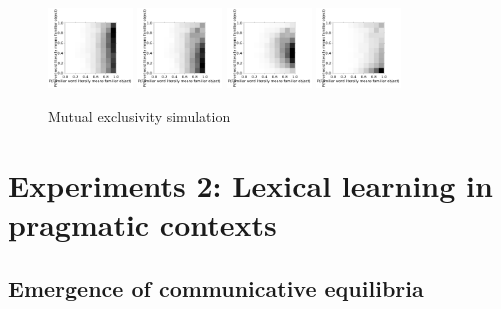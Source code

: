 \documentclass{article} %
\begin{document}
\begin{figure}[t]
  \centering
  \includegraphics[width=0.20\textwidth]{figures/ME-1dax.pdf}
  \includegraphics[width=0.20\textwidth]{figures/ME-flat-10dog-10dax.pdf}
  \includegraphics[width=0.20\textwidth]{figures/ME-antisparse-10dog-10dax.pdf}
  \includegraphics[width=0.20\textwidth]{figures/ME-sparse-10dog-10dax.pdf}
  \caption{Mutual exclusivity simulation}
  \label{fig:mutual-exclusivity}
\end{figure}

\section{Experiments 2: Lexical learning in pragmatic contexts}

\subsection{Emergence of communicative equilibria}
\end{document}
